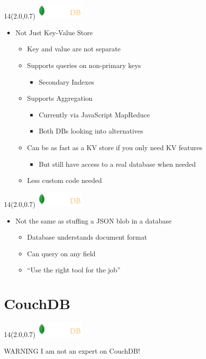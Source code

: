 \documentclass{beamer}
\newcommand{\MongoLogo}{
\begin{textblock}{14}(2.0,0.7)
  \includegraphics[height=0.8cm]{logo-mongodb-ondark.png}
\end{textblock}
}
\begin{document}
\begin{frame}
  \MongoLogo

  \begin{itemize}
    \item Not Just Key-Value Store
    \begin{itemize}
      \item Key and value are not separate
      \item Supports queries on non-primary keys
        \begin{itemize}
          \item Secondary Indexes
        \end{itemize}

      \item Supports Aggregation
        \begin{itemize}
          \item Currently via JavaScript MapReduce
          \item Both DBs looking into alternatives
        \end{itemize}
        
      \item Can be as fast as a KV store if you only need KV features
        \begin{itemize}
          \item But still have access to a real database when needed
        \end{itemize}

      \item Less custom code needed
    \end{itemize}
  \end{itemize}
\end{frame}

\begin{frame}
  \MongoLogo

  \begin{itemize}
    \item Not the same as stuffing a JSON blob in a database
    \begin{itemize}
      \item Database understands document format
      \item Can query on any field
      \item ``Use the right tool for the job''
    \end{itemize}
  \end{itemize}
\end{frame}

\section{CouchDB}
\begin{frame}[fragile]
  \MongoLogo

  \begin{block} {\color{red}WARNING}
    I am not an expert on CouchDB!
  \end{block}
\end{frame}
\end{document}
